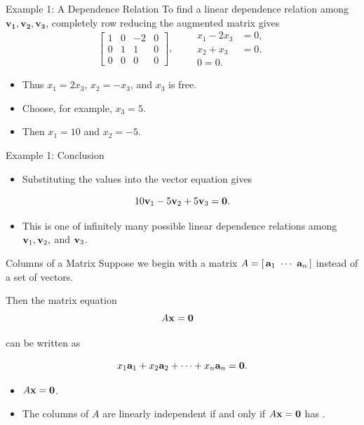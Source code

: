 \begin{frame}{Example 1: A Dependence Relation}
To find a linear dependence relation among $\mathbf{v_1}, \mathbf{v_2}, \mathbf{v_3}$, completely row reducing the augmented matrix gives\pause
\[
\left[\begin{array}{ccc|c}1&0&-2&0\\0&1&1&0\\0&0&0&0\end{array}\right],
\qquad
\begin{aligned}
x_1-2x_3&=0,\\
x_2+x_3&=0.\\
0=0.
\end{aligned}
\]
\pause
\begin{itemize}
  \item Thus $x_1=2x_3$, $x_2=-x_3$, and $x_3$ is free. \pause
  \item Choose, for example, $x_3=5$. \pause
  \item Then $x_1=10$ and $x_2=-5$.
\end{itemize}
\end{frame}

\begin{frame}{Example 1: Conclusion}
\begin{itemize}
  \item Substituting the values into the vector equation gives\pause
\end{itemize}

$$10\mathbf{v}_1-5\mathbf{v}_2+5\mathbf{v}_3=\mathbf{0}.$$
\pause
\begin{itemize}
  \item This is one of infinitely many possible linear dependence relations among
$\mathbf{v}_1,\mathbf{v}_2,$ and $\mathbf{v}_3$.
\end{itemize}

\end{frame}

\begin{frame}{Columns of a Matrix}
Suppose we begin with a matrix $A=[\,\mathbf{a}_1\ \cdots\ \mathbf{a}_n\,]$
instead of a set of vectors. \\\pause

Then the matrix equation
\[
A\mathbf{x}=\mathbf{0}
\quad
\]
\pause

can be written as

\[
x_1\mathbf{a}_1+x_2\mathbf{a}_2+\cdots+x_n\mathbf{a}_n=\mathbf{0}.
\]

\begin{itemize}\pause
\item {} $A\mathbf{x}=\mathbf{0}$.\pause
\item The columns of $A$ are linearly independent if and only if
$A\mathbf{x}=\mathbf{0}$ has {}.
\end{itemize}
\end{frame}

